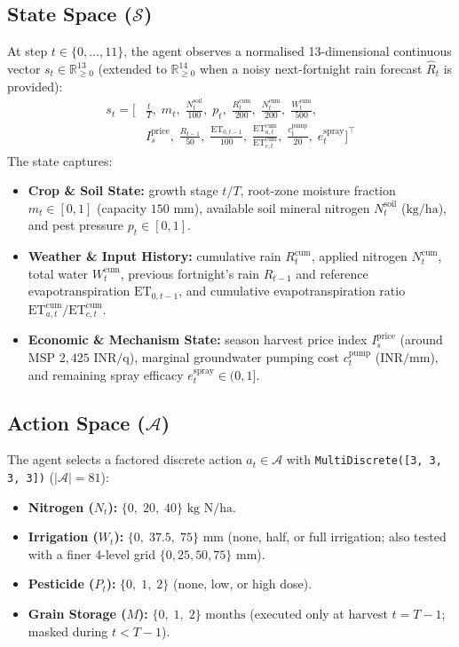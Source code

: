 \documentclass[10pt,twocolumn]{article}
\begin{document}
\subsection{State Space (\texorpdfstring{$\mathcal{S}$}{S})}
At step $t \in \{0, \dots, 11\}$, the agent observes a normalised 13-dimensional continuous vector $s_t \in \mathbb{R}_{\ge 0}^{13}$ (extended to $\mathbb{R}_{\ge 0}^{14}$ when a noisy next-fortnight rain forecast $\hat{R}_t$ is provided):
\begin{equation}
\begin{aligned}
s_t = \Big[
&\tfrac{t}{T},\; m_t,\; \tfrac{N^{\text{soil}}_t}{100},\; p_t,\; \tfrac{R^{\text{cum}}_t}{200},\; \tfrac{N^{\text{cum}}_t}{200},\; \tfrac{W^{\text{cum}}_t}{500},\\
&I^{\text{price}}_s,\; \tfrac{R_{t-1}}{50},\; \tfrac{\text{ET}_{0,t-1}}{100},\; \tfrac{\text{ET}^{\text{cum}}_{a,t}}{\text{ET}^{\text{cum}}_{c,t}},\; \tfrac{c^{\text{pump}}_t}{20},\; e^{\text{spray}}_t
\Big]^\top
\end{aligned}
\end{equation}
The state captures:
\begin{itemize}
    \item \textbf{Crop \& Soil State:} growth stage $t/T$, root-zone moisture fraction $m_t \in [0,1]$ (capacity $150\text{ mm}$), available soil mineral nitrogen $N^{\text{soil}}_t$ ($\text{kg/ha}$), and pest pressure $p_t \in [0,1]$.
    \item \textbf{Weather \& Input History:} cumulative rain $R^{\text{cum}}_t$, applied nitrogen $N^{\text{cum}}_t$, total water $W^{\text{cum}}_t$, previous fortnight's rain $R_{t-1}$ and reference evapotranspiration $\text{ET}_{0,t-1}$, and cumulative evapotranspiration ratio $\text{ET}^{\text{cum}}_{a,t}/\text{ET}^{\text{cum}}_{c,t}$.
    \item \textbf{Economic \& Mechanism State:} season harvest price index $I^{\text{price}}_s$ (around MSP $2{,}425\text{ INR/q}$), marginal groundwater pumping cost $c^{\text{pump}}_t$ ($\text{INR/mm}$), and remaining spray efficacy $e^{\text{spray}}_t \in (0,1]$.
\end{itemize}

\subsection{Action Space (\texorpdfstring{$\mathcal{A}$}{A})}
The agent selects a factored discrete action $a_t \in \mathcal{A}$ with \texttt{MultiDiscrete([3, 3, 3, 3])} ($|\mathcal{A}| = 81$):
\begin{itemize}
    \item \textbf{Nitrogen ($N_t$):} $\{0,\; 20,\; 40\}\text{ kg N/ha}$.
    \item \textbf{Irrigation ($W_t$):} $\{0,\; 37.5,\; 75\}\text{ mm}$ (none, half, or full irrigation; also tested with a finer 4-level grid $\{0, 25, 50, 75\}\text{ mm}$).
    \item \textbf{Pesticide ($P_t$):} $\{0,\; 1,\; 2\}$ (none, low, or high dose).
    \item \textbf{Grain Storage ($M$):} $\{0,\; 1,\; 2\}\text{ months}$ (executed only at harvest $t = T-1$; masked during $t < T-1$).
\end{itemize}
\end{document}
